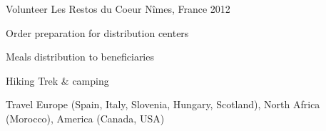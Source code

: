 

\begin{cventries}

  \cventry
    {Volunteer} %
    {Les Restos du Coeur} %
    {Nîmes, France} %
    {2012} %
    {
      \begin{cvitems} %
        \item {Order preparation for distribution centers}
        \item {Meals distribution to beneficiaries}
      \end{cvitems}
    }

\end{cventries}


\begin{cvhonors}

  \cvhonor
    {Hiking} %
    {Trek \& camping} %
    {} %
    {} %

  \cvhonor
    {Travel} %
    {Europe (Spain, Italy, Slovenia, Hungary, Scotland), North Africa (Morocco), America (Canada, USA)} %
    {} %
    {} %
\end{cvhonors}
